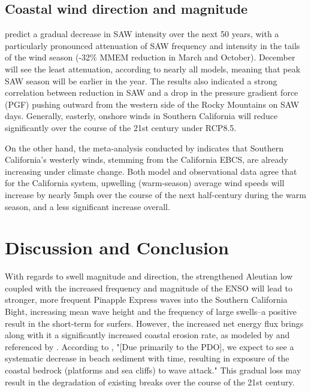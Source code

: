 \documentclass[12pt, letterpaper]{article}
\begin{document}
	\subsection {Coastal wind direction and magnitude}
	\citeauthor{winds-santa-ana} predict a gradual decrease in SAW intensity over the next 50 years, with a particularly pronounced attenuation of SAW frequency and intensity in the tails of the wind season (-32\% MMEM reduction in March and October). December will see the least attenuation, according to nearly all models, meaning that peak SAW season will be earlier in the year. The results also indicated a strong correlation between reduction in SAW and a drop in the pressure gradient force (PGF) pushing outward from the western side of the Rocky Mountains on SAW days. Generally, easterly, onshore winds in Southern California will reduce significantly over the course of the 21st century under RCP8.5. \citep{winds-santa-ana}

	On the other hand, the meta-analysis conducted by \citeauthor{winds-coastal} indicates that Southern California's westerly winds, stemming from the California EBCS, are already increasing under climate change. Both model and observational data agree that for the California system, upwelling (warm-season) average wind speeds will increase by nearly 5mph over the course of the next half-century during the warm season, and a less significant increase overall. \citep{winds-coastal}

	\section {Discussion and Conclusion}
	With regards to swell magnitude and direction, the strengthened Aleutian low coupled with the increased frequency and magnitude of the ENSO \citep{bath-el-nino} will lead to stronger, more frequent Pinapple Express waves into the Southern California Bight, increasing mean wave height and the frequency of large swells--a positive result in the short-term for surfers. However, the increased net energy flux brings along with it a significantly increased coastal erosion rate, as modeled by \citeauthor{bath-cosmos} and referenced by \citeauthor{swells-deep-water-waves}. According to \citeauthor{swells-deep-water-waves}, "[Due primarily to the PDO], we expect to see a systematic decrease in beach sediment with time, resulting in exposure of the coastal bedrock (platforms and sea cliffs) to wave attack." This gradual loss may result in the degradation of existing breaks over the course of the 21st century. 
\end{document}
